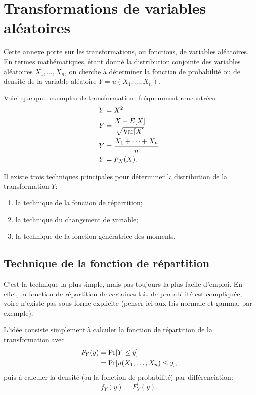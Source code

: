 \chapter{Transformations de variables aléatoires}
\label{chap:rappels_transformations}

Cette annexe porte sur les transformations, ou fonctions, de variables
aléatoires. En termes mathématiques, étant donné la distribution
conjointe des variables aléatoires $X_1, \dots, X_n$, on cherche à
déterminer la fonction de probabilité ou de densité de la variable
aléatoire $Y = u(X_1, \dots, X_n)$.

Voici quelques exemples de transformations fréquemment rencontrées:
\begin{align*}
  Y &= X^2 \\
  Y &= \frac{X - E [ X ]}{\sqrt{\operatorname{Var} [ X ]}} \\
  Y &= \frac{X_1 + \dots + X_n}{n} \\
  Y &= F_X(X).
\end{align*}

Il existe trois techniques principales pour déterminer la distribution
de la transformation $Y$:
\begin{enumerate}
\item la technique de la fonction de répartition;
\item la technique du changement de variable;
\item la technique de la fonction génératrice des moments.
\end{enumerate}


\section{Technique de la fonction de répartition}

C'est la technique la plus simple, mais pas toujours la plus facile
d'emploi. En effet, la fonction de répartition de certaines lois de
probabilité est compliquée, voire n'existe pas sous forme explicite
(penser ici aux lois normale et gamma, par exemple).

L'idée consiste simplement à calculer la fonction de répartition de la
transformation avec
\begin{align*}
  F_Y(y)
  &= \operatorname{Pr} [ Y \leq y ] \\
  &= \operatorname{Pr} [ u(X_1, \dots, X_n) \leq y ],
\end{align*}
puis à calculer la densité (ou la fonction de probabilité) par
différenciation:
\begin{displaymath}
  f_Y(y) = F_Y^\prime(y).
\end{displaymath}

